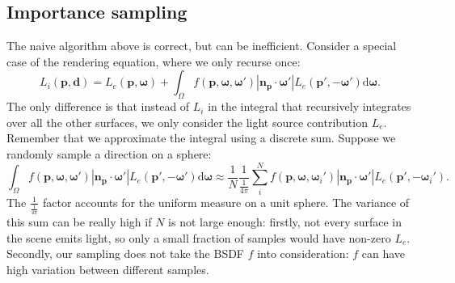 \subsection{Importance sampling}
The naive algorithm above is correct, but can be inefficient. Consider a special case of the rendering equation, where we only recurse once:
\begin{equation}
    L_i(\mathbf{p}, \mathbf{d}) = L_e(\mathbf{p}, \mathbf{\omega}) + \int_{\Omega} f(\mathbf{p}, \mathbf{\omega}, \mathbf{\omega}') |\mathbf{n}_{\mathbf{p}} \cdot \mathbf{\omega}'| L_e(\mathbf{p}', -\mathbf{\omega}') \mathrm{d} \mathbf{\omega}.
\end{equation}
The only difference is that instead of $L_i$ in the integral that recursively integrates over all the other surfaces, we only consider the light source contribution $L_e$. Remember that we approximate the integral using a discrete sum. Suppose we randomly sample a direction on a sphere:
\begin{equation}
  \int_{\Omega} f(\mathbf{p}, \mathbf{\omega}, \mathbf{\omega}') |\mathbf{n}_{\mathbf{p}} \cdot \mathbf{\omega}'| L_e(\mathbf{p}', -\mathbf{\omega}') \mathrm{d} \mathbf{\omega} \approx \frac{1}{N} \frac{1}{\frac{1}{4 \pi}} \sum_{i}^{N} f(\mathbf{p}, \mathbf{\omega}, \mathbf{\omega}_i') |\mathbf{n}_{\mathbf{p}} \cdot \mathbf{\omega}'| L_e(\mathbf{p}', -\mathbf{\omega}_i').
\end{equation}
The $\frac{1}{\frac{1}{4\pi}}$ factor accounts for the uniform measure on a unit sphere. The variance of this sum can be really high if $N$ is not large enough: firstly, not every surface in the scene emits light, so only a small fraction of samples would have non-zero $L_e$. Secondly, our sampling does not take the BSDF $f$ into consideration: $f$ can have high variation between different samples.

